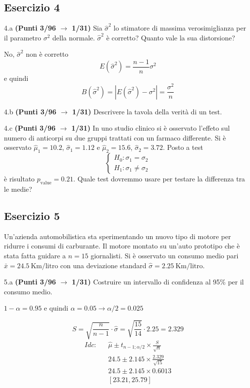 \documentclass[
  11pt,
]{book}
\theoremstyle{mytheoremstyle}
\theoremstyle{mydefstyle}
\newenvironment{sol}
  {
  \begin{tcolorbox}[enhanced,breakable,arc=0.1mm,boxrule=1pt,colback=white,colframe=iblue,
  title=\bf \fontfamily{lmss}\selectfont \hspace{.5 cm} Soluzione,drop fuzzy shadow]

}{
\end{tcolorbox}
  }
\begin{document}
\subsection{Esercizio 4}\label{esercizio-4-7}

4.a \textbf{(Punti 3/96 \(\rightarrow\) 1/31)} Sia \(\hat\sigma^2\) lo stimatore di massima verosimiglianza per il parametro \(\sigma^2\) della normale. \(\hat\sigma^2\) è corretto? Quanto vale la sua distorsione?

\begin{sol}
No, \(\hat\sigma^2\) non è corretto
\[
E(\hat\sigma^2)=\frac{n-1}n\sigma^2
\]
e quindi
\[
B(\hat\sigma^2)=|E(\hat\sigma^2)-\sigma^2|=\frac {\sigma^2}n
\]

\end{sol}

4.b \textbf{(Punti 3/96 \(\rightarrow\) 1/31)} Descrivere la tavola della verità di un test.

4.c \textbf{(Punti 3/96 \(\rightarrow\) 1/31)} In uno studio clinico si è osservato l'effeto sul numero di anticorpi su due gruppi trattati con un farmaco differente. Si è osservato \(\hat\mu_1=10.2\), \(\hat\sigma_1=1.12\) e \(\hat\mu_2=15.6\), \(\hat\sigma_2=3.72\). Posto a test
\[
\begin{cases}
H_0:\sigma_1=\sigma_2\\
H_1:\sigma_1\ne \sigma_2
\end{cases}
\]
è risultato \(p_\text{value}=0.21\). Quale test dovremmo usare per testare la differenza tra le medie?

\subsection{Esercizio 5}\label{esercizio-5-6}

Un'azienda automobilistica sta sperimentando un nuovo tipo di motore per ridurre i consumi di carburante. Il motore montato su un'auto prototipo che è stata fatta guidare a \(n=15\) giornalisti. Si è osservato un consumo medio pari \(\bar x=24.5~\text{Km/litro}\) con una deviazione standard \(\hat\sigma=2.25~\text{Km/litro}\).

5.a \textbf{(Punti 3/96 \(\rightarrow\) 1/31)} Costruire un intervallo di confidenza al 95\% per il consumo medio.

\begin{sol}
\(1-\alpha =0.95\) e quindi \(\alpha=0.05\rightarrow \alpha/2=0.025\)

\[
      S  =\sqrt{\frac {n}{n-1}}\cdot\hat\sigma =
     \sqrt{\frac { 15 }{ 14 }}\cdot 2.25 = 2.329 
\]
\begin{eqnarray*}
  Idc: & &  \hat\mu \pm  t_{n-1;\alpha/2} \times \frac{S}{\sqrt{n}} \\
     & &  24.5 \pm  2.145 \times \frac{ 2.329 }{\sqrt{ 15 }} \\
     & &  24.5 \pm  2.145 \times  0.6013 \\
     & & [ 23.21 ,  25.79 ]
\end{eqnarray*}

\end{sol}
\end{document}
